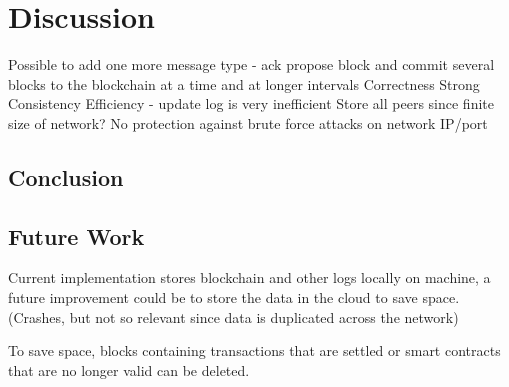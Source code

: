 \chapter{Discussion}
Possible to add one more message type - ack propose block and commit several blocks to the blockchain at a time and at longer intervals
Correctness
Strong Consistency
Efficiency - update log is very inefficient
Store all peers since finite size of network?
No protection against brute force attacks on network IP/port 
\section{Conclusion}

\section{Future Work}
Current implementation stores blockchain and other logs locally on machine, a future improvement could be to store the data in the cloud to save space. (Crashes, but not so relevant since data is duplicated across the network)

To save space, blocks containing transactions that are settled or smart contracts that are no longer valid can be deleted. 

